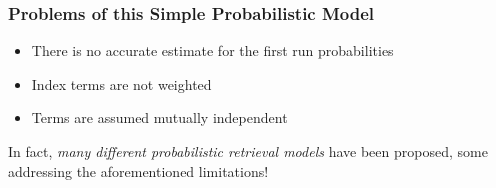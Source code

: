 \documentclass[svgnames]{beamer}
\begin{document}

\begin{frame} \frametitle{Problems of this Simple Probabilistic Model}
  \begin{block}{}
    \begin{itemize}
    \item There is no accurate estimate for the first run probabilities
    \item Index terms are not weighted
    \item Terms are assumed mutually independent
    \end{itemize}
  \end{block}
  \begin{block}{}
    In fact, \emph{many different probabilistic retrieval models} have been proposed, some addressing the aforementioned limitations!
  \end{block}
\end{frame}

\end{document}
